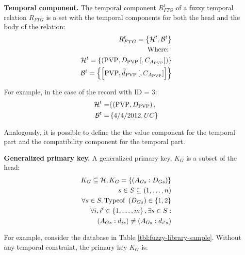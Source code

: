\begin{definition}
\label{def:temporal-component}
\textbf{Temporal component.}
The temporal component $R^{t}_{FTG}$ of a fuzzy temporal relation $R_{FTG}$ is a set with the temporal components for both the head and the body of the relation:
\begin{align}
\label{eq:temporal-component}
R^{t}_{FTG} = \left \lbrace \mathcal{H}^{t},\mathcal{B}^{t} \right \rbrace \\
\nonumber
\text{Where: } \\
\nonumber
\mathcal{H}^{t} = \left \lbrace \left( \text{PVP}, D_{\text{PVP}}\left[,C_{A_{\text{PVP}}} \right] \right) \right \rbrace \\
\nonumber
\mathcal{B}^ {t} = \left \lbrace  \left[ \text{PVP}, \widetilde{d}_{\text{PVP}} \left[,C_{A_{\text{PVP}}} \right] \right]  \right \rbrace 
\end{align}
\end{definition}

For example, in the case of the record with ID = 3:
\begin{align}
\nonumber
\mathcal{H}^{t} = & \lbrace \left( \text{PVP}, D_{\text{PVP}}\right),\\
\nonumber
\mathcal{B}^ {t} =& \left \lbrace 4/4/2012 , UC \right \rbrace 
\end{align}


Analogously, it is possible to define the the value component for the temporal part and the compatibility component for the temporal part. 

\begin{definition}
\label{def:generalized-primary-key}
\textbf{Generalized primary key.}
A generalized primary key, $K_G$ is a subset of the head:
\begin{align}
\label{eq:generalized-primary-key}
K_G \subseteq \mathcal{H}, K_G = \left \lbrace  \left(A_{Gs}:D_{Gs} \right) \right \rbrace \\
\nonumber
s\in S \subseteq \left(1, \ldots, n \right) \\
\nonumber
\forall s \in S, \text{Typeof } \left(D_{Gs} \right) \in \left \lbrace 1, 2 \right \rbrace \\
\nonumber
\forall i, i' \in \left \lbrace 1, \ldots, m\right \rbrace , \exists s \in S: \\
\nonumber
\left(A_{Gs}:d_{is} \right) \neq \left(A_{Gs}:d_{i's} \right)
\end{align}
\end{definition}

For example, consider the database in Table \ref{tbl:fuzzy-library-sample}. Without any temporal constraint, the primary key $K_G$ is:

